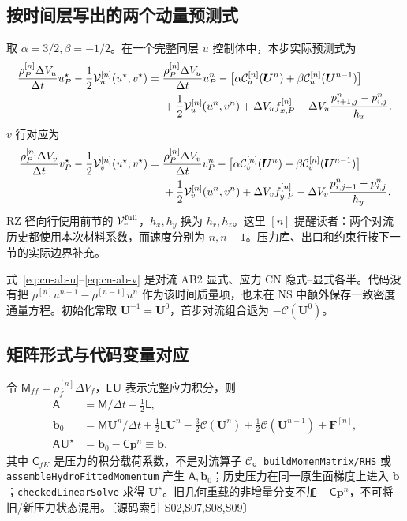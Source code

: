 \documentclass[UTF8,a4paper,11pt,fontset=fandol]{ctexart}
\newcommand{\code}[1]{\nolinkurl{#1}}
\newcommand{\src}[1]{\textcolor{ink}{\small〔源码索引 #1〕}}
\newcommand{\UU}{\bm{U}}
\newcommand{\dt}{\Delta t}
\newcommand{\mat}[1]{\mathsf{#1}}
\begin{document}
\subsection{按时间层写出的两个动量预测式}
取 $\alpha=3/2,\beta=-1/2$。在一个完整同层 $u$ 控制体中，本步实际预测式为
\begin{align}
 \frac{\rho_P^{[n]}\Delta V_u}{\dt}u_P^\star
 -\frac12\mathcal V_u^{[n]}(u^\star,v^\star)
 ={}&\frac{\rho_P^{[n]}\Delta V_u}{\dt}u_P^n
 -\big[\alpha\mathcal C_u^{[n]}(\UU^n)+\beta\mathcal C_u^{[n]}(\UU^{n-1})\big]\notag\\
 &+\frac12\mathcal V_u^{[n]}(u^n,v^n)
 +\Delta V_u f_{x,P}^{[n]}
 -\Delta V_u\frac{p^n_{i+1,j}-p^n_{i,j}}{h_x}.
 \label{eq:cn-ab-u}
\end{align}
$v$ 行对应为
\begin{align}
 \frac{\rho_P^{[n]}\Delta V_v}{\dt}v_P^\star
 -\frac12\mathcal V_v^{[n]}(u^\star,v^\star)
 ={}&\frac{\rho_P^{[n]}\Delta V_v}{\dt}v_P^n
 -\big[\alpha\mathcal C_v^{[n]}(\UU^n)+\beta\mathcal C_v^{[n]}(\UU^{n-1})\big]\notag\\
 &+\frac12\mathcal V_v^{[n]}(u^n,v^n)
 +\Delta V_v f_{y,P}^{[n]}
 -\Delta V_v\frac{p^n_{i,j+1}-p^n_{i,j}}{h_y}.
 \label{eq:cn-ab-v}
\end{align}
RZ 径向行使用前节的 $\mathcal V_r^{\rm full}$，$h_x,h_y$ 换为 $h_r,h_z$。这里 $[n]$ 提醒读者：两个对流历史都使用本次材料系数，而速度分别为 $n,n-1$。压力库、出口和约束行按下一节的实际边界补充。

式~\eqref{eq:cn-ab-u}--\eqref{eq:cn-ab-v} 是对流 AB2 显式、应力 CN 隐式--显式各半。代码没有把 $\rho^{[n]}u^{n+1}-\rho^{[n-1]}u^n$ 作为该时间质量项，也未在 NS 中额外保存一致密度通量方程。初始化常取 $\UU^{-1}=\UU^0$，首步对流组合退为 $-\mathcal C(\UU^0)$。

\subsection{矩阵形式与代码变量对应}
令 $\mat M_{ff}=\rho_f^{[n]}\Delta V_f$，$\mat L\UU$ 表示完整应力积分，则
\begin{align}
 \mat A&=\mat M/\dt-\tfrac12\mat L,\\
 \bm b_0&=\mat M\UU^n/\dt+\tfrac12\mat L\UU^n
       -\tfrac32\bm{\mathcal C}(\UU^n)+\tfrac12\bm{\mathcal C}(\UU^{n-1})+\bm F^{[n]},\\
 \mat A\UU^\star&=\bm b_0-\mat C\bm p^n\equiv\bm b.\label{eq:predictor}
\end{align}
其中 $\mat C_{fK}$ 是压力的积分载荷系数，不是对流算子 $\mathcal C$。\code{buildMomenMatrix/RHS} 或 \code{assembleHydroFittedMomentum} 产生 $\mat A,\bm b_0$；历史压力在同一原生面梯度上进入 $\bm b$；\code{checkedLinearSolve} 求得 $\UU^\star$。旧几何重载的非增量分支不加 $-\mat C\bm p^n$，不可将旧/新压力状态混用。\src{S02,S07,S08,S09}
\end{document}
